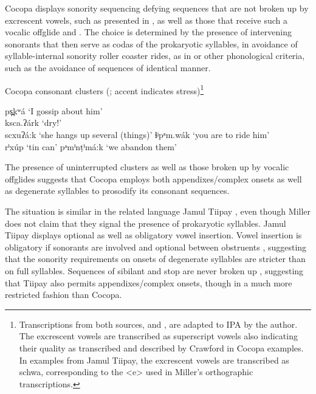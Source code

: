 \documentclass[output=paper,colorlinks,citecolor=brown]{langscibook}
\begin{document}
Cocopa displays sonority sequencing defying sequences that are not broken up by excrescent vowels, such as presented in , as well as those that receive such a vocalic offglide  and . The choice is determined by the presence of intervening sonorants that then serve as codas of the prokaryotic syllables, in avoidance of syllable-internal sonority roller coaster rides, as in  or other phonological criteria, such as the avoidance of sequences of identical manner. 

\begin{exe}
    \ex Cocopa consonant clusters (\citealt{Crawford1966}; accent indicates stress)\footnote{Transcriptions from both sources, \citet{Crawford1966} and \citet{Miller2001}, are adapted to IPA by the author. The excrescent vowels are transcribed as superscript vowels also indicating their quality as transcribed and described by Crawford in Cocopa examples. In examples from Jamul Tiipay, the excrescent vowels are transcribed as schwa, corresponding to the <e> used in Miller's orthographic transcriptions.}
    \begin{xlist}
        \ex \label{ex1a} ps̪kʷá  \tab     ‘I gossip about him’\\
        ksca.ʔárk    \tab ‘dry!’\\
        scxuʔá:k    \tab  ‘she hangs up several (things)’
        \ex \label{ex1b}  ɬʲpᵃm.wák \tab    ‘you are to ride him’\\
        rⁱxúp    \tab    ‘tin can’
        \ex \label{ex1c} pᵃmⁱnṭⁱmá:k \tab  ‘we abandon them’
    \end{xlist}
\end{exe}


The presence of uninterrupted clusters as well as those broken up by vocalic offglides suggests that Cocopa employs both appendixes/complex onsets as well as degenerate syllables to prosodify its consonant sequences.

The situation is similar in the related language Jamul Tiipay \citep{Miller2001}, even though Miller does not claim that they signal the presence of prokaryotic syllables. Jamul Tiipay displays optional as well as obligatory vowel insertion. Vowel insertion is obligatory if sonorants are involved  and optional between obstruents , suggesting that the sonority requirements on onsets of degenerate syllables are stricter than on full syllables. Sequences of sibilant and stop are never broken up , suggesting that Tiipay also permits appendixes/complex onsets, though in a much more restricted fashion than Cocopa.
\end{document}
